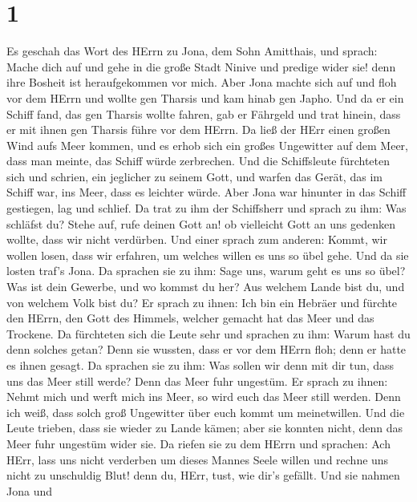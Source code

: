 \hypertarget{section}{%
\section{1}\label{section}}

 Es geschah das Wort des HErrn zu Jona, dem Sohn Amitthais,
und sprach:  Mache dich auf und gehe in die große Stadt
Ninive und predige wider sie! denn ihre Bosheit ist heraufgekommen vor
mich.  Aber Jona machte sich auf und floh vor dem HErrn und
wollte gen Tharsis und kam hinab gen Japho. Und da er ein Schiff fand,
das gen Tharsis wollte fahren, gab er Fährgeld und trat hinein, dass er
mit ihnen gen Tharsis führe vor dem HErrn.  Da ließ der HErr
einen großen Wind aufs Meer kommen, und es erhob sich ein großes
Ungewitter auf dem Meer, dass man meinte, das Schiff würde zerbrechen.
 Und die Schiffsleute fürchteten sich und schrien, ein
jeglicher zu seinem Gott, und warfen das Gerät, das im Schiff war, ins
Meer, dass es leichter würde. Aber Jona war hinunter in das Schiff
gestiegen, lag und schlief.  Da trat zu ihm der Schiffsherr
und sprach zu ihm: Was schläfst du? Stehe auf, rufe deinen Gott an! ob
vielleicht Gott an uns gedenken wollte, dass wir nicht verdürben.
 Und einer sprach zum anderen: Kommt, wir wollen losen, dass
wir erfahren, um welches willen es uns so übel gehe. Und da sie losten
traf's Jona.  Da sprachen sie zu ihm: Sage uns, warum geht
es uns so übel? Was ist dein Gewerbe, und wo kommst du her? Aus welchem
Lande bist du, und von welchem Volk bist du?  Er sprach zu
ihnen: Ich bin ein Hebräer und fürchte den HErrn, den Gott des Himmels,
welcher gemacht hat das Meer und das Trockene.  Da
fürchteten sich die Leute sehr und sprachen zu ihm: Warum hast du denn
solches getan? Denn sie wussten, dass er vor dem HErrn floh; denn er
hatte es ihnen gesagt.  Da sprachen sie zu ihm: Was sollen
wir denn mit dir tun, dass uns das Meer still werde? Denn das Meer fuhr
ungestüm.  Er sprach zu ihnen: Nehmt mich und werft mich
ins Meer, so wird euch das Meer still werden. Denn ich weiß, dass solch
groß Ungewitter über euch kommt um meinetwillen.  Und die
Leute trieben, dass sie wieder zu Lande kämen; aber sie konnten nicht,
denn das Meer fuhr ungestüm wider sie.  Da riefen sie zu
dem HErrn und sprachen: Ach HErr, lass uns nicht verderben um dieses
Mannes Seele willen und rechne uns nicht zu unschuldig Blut! denn du,
HErr, tust, wie dir's gefällt.  Und sie nahmen Jona und
